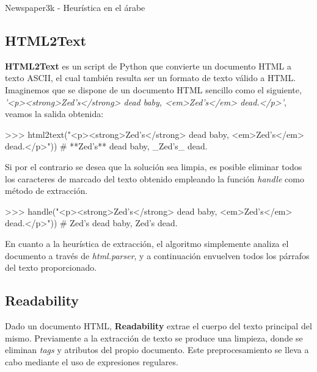 \begin{codefloat}
  
  \caption{Newspaper3k - Heurística en el árabe}
  \label{cod:newspaper3k - heuristica en el arabe}
\end{codefloat}

\subsection{HTML2Text}
\label{subsec:html2text}

\textbf{HTML2Text} \cite{html2text} es un script de Python que convierte un documento HTML a texto ASCII, 
el cual también resulta ser un formato de texto válido a HTML. Imaginemos que se dispone de un documento 
HTML sencillo como el siguiente, \emph{'<p><strong>Zed's</strong> dead baby, <em>Zed's</em> dead.</p>'}, 
veamos la salida obtenida:

\begin{Schunk}
  \begin{Soutput}
    >>> html2text("<p><strong>Zed's</strong> dead baby, <em>Zed's</em> dead.</p>"))
    # **Zed's** dead baby, _Zed's_ dead.
  \end{Soutput}
\end{Schunk}

Si por el contrario se desea que la solución sea limpia, es posible eliminar todos los caracteres de
marcado del texto obtenido empleando la función \emph{handle} como método de extracción.

\begin{Schunk}
  \begin{Soutput}
    >>> handle("<p><strong>Zed's</strong> dead baby, <em>Zed's</em> dead.</p>"))
    # Zed's dead baby, Zed's dead.
  \end{Soutput}
\end{Schunk}

En cuanto a la heurística de extracción, el algoritmo simplemente analiza el documento a través de
\emph{html.parser}, y a continuación envuelven todos los párrafos del texto proporcionado.

\subsection{Readability}
\label{subsec:readability}

Dado un documento HTML, \textbf{Readability} \cite{readability} extrae el cuerpo del texto principal del 
mismo. Previamente a la extracción de texto se produce una limpieza, donde se eliminan \emph{tags} y 
atributos del propio documento. Este preprocesamiento se lleva a cabo mediante el uso de expresiones 
regulares.

